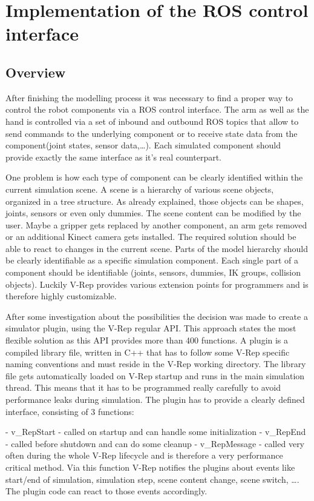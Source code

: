 \section{Implementation of the ROS control interface}

\subsection{Overview}

After finishing the modelling process it was necessary to find a proper way to control the robot components via a ROS control interface. The arm as well as the hand is controlled via a set of inbound and outbound ROS topics that allow to send commands to the underlying component or to receive state data from the component(joint states, sensor data,\ldots). Each simulated component should provide exactly the same interface as it's real counterpart.

One problem is how each type of component can be clearly identified within the current simulation scene. A scene is a hierarchy of various scene objects, organized in a tree structure. As already explained, those objects can be shapes, joints, sensors or even only dummies. The scene content can be modified by the user. Maybe a gripper gets replaced by another component, an arm gets removed or an additional Kinect camera gets installed. The required solution should be able to react to changes in the current scene. Parts of the model hierarchy should be clearly identifiable as a specific simulation component. Each single part of a component should be identifiable (joints, sensors, dummies, IK groups, collision objects). Luckily V-Rep provides various extension points for programmers and is therefore highly customizable. 

After some investigation about the possibilities the decision was made to create a simulator plugin, using the V-Rep regular API. This approach states the most flexible solution as this API provides more than 400 functions. A plugin is a compiled library file, written in C++ that has to follow some V-Rep specific naming conventions and must reside in the V-Rep working directory. The library file gets automatically loaded on V-Rep startup and runs in the main simulation thread. This means that it has to be programmed really carefully to avoid performance leaks during simulation. The plugin has to provide a clearly defined interface, consisting of 3 functions:

- v\_RepStart - called on startup and can handle some initialization
- v\_RepEnd - called before shutdown and can do some cleanup
- v\_RepMessage - called very often during the whole V-Rep lifecycle and is therefore a very
  performance critical method. Via this function V-Rep notifies the plugins about events like
  start/end of simulation, simulation step, scene content change, scene switch, \ldots.
  The plugin code can react to those events accordingly.



